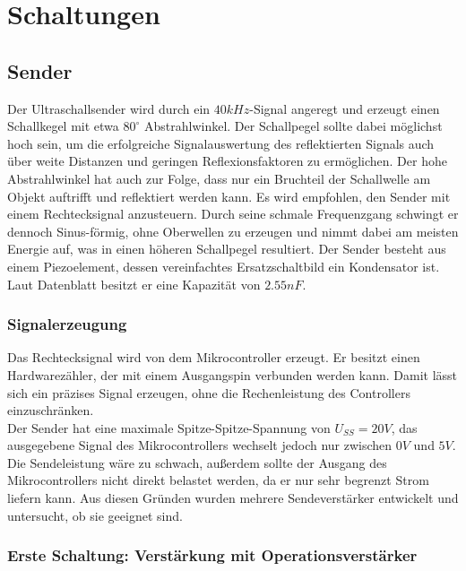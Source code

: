 
\chapter{Schaltungen}


\section{Sender}
Der Ultraschallsender wird durch ein $40 kHz$-Signal angeregt und erzeugt einen Schallkegel mit etwa $80^\circ$ Abstrahlwinkel. Der Schallpegel sollte dabei möglichst hoch sein, um die erfolgreiche Signalauswertung des reflektierten Signals auch über weite Distanzen und geringen Reflexionsfaktoren zu ermöglichen. Der hohe Abstrahlwinkel hat auch zur Folge, dass nur ein Bruchteil der Schallwelle am Objekt auftrifft und reflektiert werden kann. Es wird empfohlen, den Sender mit einem Rechtecksignal anzusteuern. Durch seine schmale Frequenzgang schwingt er dennoch Sinus-förmig, ohne Oberwellen zu erzeugen und nimmt dabei am meisten Energie auf, was in einen höheren Schallpegel resultiert. Der Sender besteht aus einem Piezoelement, dessen vereinfachtes Ersatzschaltbild ein Kondensator ist. Laut Datenblatt besitzt er eine Kapazität von $2.55nF$.


\subsection{Signalerzeugung}
Das Rechtecksignal wird von dem Mikrocontroller erzeugt. Er besitzt einen Hardwarezähler, der mit einem Ausgangspin verbunden werden kann. Damit lässt sich ein präzises Signal erzeugen, ohne die Rechenleistung des Controllers einzuschränken.\\
Der Sender hat eine maximale Spitze-Spitze-Spannung von $U_{SS} = 20V$, das ausgegebene Signal des Mikrocontrollers wechselt jedoch nur zwischen $0V$ und $5V$. Die Sendeleistung wäre zu schwach, außerdem sollte der Ausgang des Mikrocontrollers nicht direkt belastet werden, da er nur sehr begrenzt Strom liefern kann. Aus diesen Gründen wurden mehrere Sendeverstärker entwickelt und untersucht, ob sie geeignet sind.



\subsection{Erste Schaltung: Verstärkung mit Operationsverstärker}
